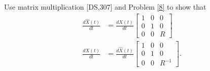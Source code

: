 \documentclass{ximera}
\begin{document}
\begin{problem}
Use matrix multiplication [DS,307] and Problem \ref{8} to show that%
\begin{align*}
\frac{d\hat{X}\left(  t\right)  }{dt}  &  =\frac{dX(t)}{dt}
\begin{bmatrix}
1 & 0 & 0\\
0 & 1 & 0\\
0 & 0 & R
\end{bmatrix} \\
\frac{dX(t)}{dt}  &=\frac{d\hat{X}(t)
}{dt}
\begin{bmatrix}
1 & 0 & 0\\
0 & 1 & 0\\
0 & 0 & R^{-1}%
\end{bmatrix}.
\end{align*}

\end{problem}
\end{document}
